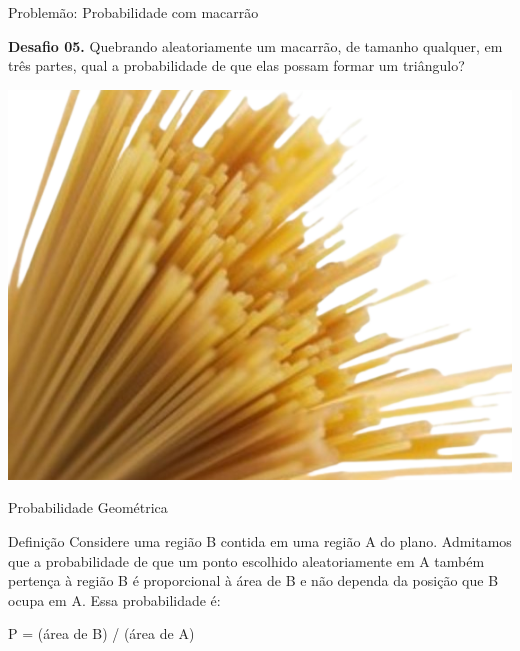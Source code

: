 \documentclass[12pt]{beamer}
\begin{document}
\begin{frame}{Problemão: Probabilidade com macarrão}

    \begin{exampleblock}{\textbf{Desafio 05.}}
        \justifying
        Quebrando aleatoriamente um macarrão, de tamanho qualquer, em três partes, qual a probabilidade de que elas possam formar um triângulo?

        \begin{center}
            \includegraphics[scale=0.3]{imagens/macarrao_rmvbg.png}
        \end{center}
    
    \end{exampleblock}
   
\end{frame}

\begin{frame}{Probabilidade Geométrica}
	\begin{alertblock}{Definição}
		\justifying
		Considere uma região B contida em uma região A do plano. Admitamos que a probabilidade de que um ponto escolhido aleatoriamente em A também pertença à região B é proporcional à área de B e não dependa da posição que B ocupa em A. Essa probabilidade é:
		
		\begin{center}
			P = (área de B) / (área de A)
		\end{center} 
	\end{alertblock}
\end{frame}
\end{document}
